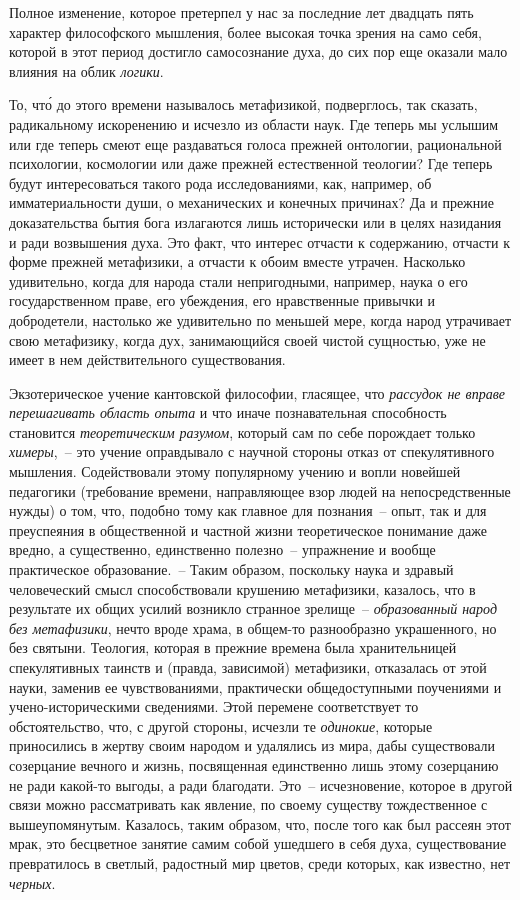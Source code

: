 Полное изменение, которое претерпел у нас за последние
лет двадцать пять характер философского мышления,
более высокая точка зрения на само себя, которой
в этот период достигло самосознание духа, до сих пор
еще оказали мало влияния на облик \emph{логики}.

То, чт\'о до этого времени называлось метафизикой,
подверглось, так сказать, радикальному искоренению и
исчезло из области наук. Где теперь мы услышим или
где теперь смеют еще раздаваться голоса прежней онтологии,
рациональной психологии, космологии или даже
прежней естественной теологии? Где теперь будут интересоваться
такого рода исследованиями, как, например,
об имматериальности души, о механических и конечных
причинах? Да и прежние доказательства бытия бога излагаются
лишь исторически или в целях назидания и ради
возвышения духа. Это факт, что интерес отчасти к содержанию,
отчасти к форме прежней метафизики, а отчасти
к обоим вместе утрачен. Насколько удивительно, когда
для народа стали непригодными, например, наука о
его государственном праве, его убеждения, его нравственные
привычки и добродетели, настолько же удивительно
по меньшей мере, когда народ утрачивает свою метафизику,
когда дух, занимающийся своей чистой сущностью,
уже не имеет в нем действительного существования.

Экзотерическое учение кантовской философии, гласящее,
что \emph{рассудок не вправе перешагивать область
опыта} и что иначе познавательная способность становится
\emph{теоретическим разумом}, который сам по себе порождает
только \emph{химеры},~-- это учение оправдывало с научной
стороны отказ от спекулятивного мышления. Содействовали
этому популярному учению и вопли новейшей
педагогики (требование времени, направляющее взор
людей на непосредственные нужды) о том, что, подобно
тому как главное для познания~-- опыт, так и для преуспеяния
в общественной и частной жизни теоретическое
понимание даже вредно, а существенно, единственно
полезно~-- упражнение и вообще практическое образование.~--
Таким образом, поскольку наука и здравый человеческий
смысл способствовали крушению метафизики,
казалось, что в результате их общих усилий возникло
странное зрелище~-- \emph{образованный народ без метафизики},
нечто вроде храма, в общем-то разнообразно украшенного,
но без святыни. Теология, которая в прежние времена
была хранительницей спекулятивных таинств и
(правда, зависимой) метафизики, отказалась от этой науки,
заменив ее чувствованиями, практически общедоступными
поучениями и учено-историческими сведениями.
Этой перемене соответствует то обстоятельство, что, с
другой стороны, исчезли те \emph{одинокие}, которые приносились
в жертву своим народом и удалялись из мира, дабы
существовали созерцание вечного и жизнь, посвященная
единственно лишь этому созерцанию не ради какой-то
выгоды, а ради благодати. Это~-- исчезновение, которое
в другой связи можно рассматривать как явление, по
своему существу тождественное с вышеупомянутым. Казалось,
таким образом, что, после того как был рассеян
этот мрак, это бесцветное занятие самим собой ушедшего
в себя духа, существование превратилось в светлый, радостный
мир цветов, среди которых, как известно, нет
\emph{черных}.


